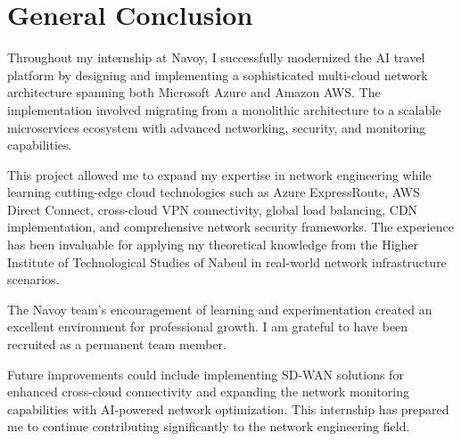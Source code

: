 \thispagestyle{plain} %
\section*{General Conclusion}
Throughout my internship at Navoy, I successfully modernized the AI travel platform by designing and implementing a sophisticated multi-cloud network architecture spanning both Microsoft Azure and Amazon AWS. The implementation involved migrating from a monolithic architecture to a scalable microservices ecosystem with advanced networking, security, and monitoring capabilities.

This project allowed me to expand my expertise in network engineering while learning cutting-edge cloud technologies such as Azure ExpressRoute, AWS Direct Connect, cross-cloud VPN connectivity, global load balancing, CDN implementation, and comprehensive network security frameworks. The experience has been invaluable for applying my theoretical knowledge from the Higher Institute of Technological Studies of Nabeul in real-world network infrastructure scenarios.

The Navoy team's encouragement of learning and experimentation created an excellent environment for professional growth. I am grateful to have been recruited as a permanent team member.

Future improvements could include implementing SD-WAN solutions for enhanced cross-cloud connectivity and expanding the network monitoring capabilities with AI-powered network optimization. This internship has prepared me to continue contributing significantly to the network engineering field.

\newpage
